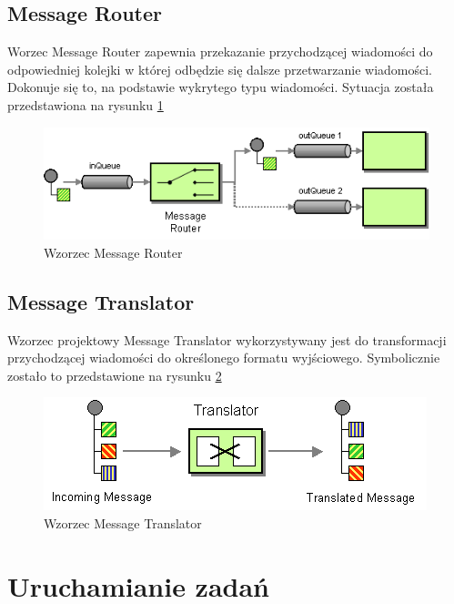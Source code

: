 \subsection{Message Router}
Worzec Message Router zapewnia przekazanie przychodzącej wiadomości do odpowiedniej kolejki w której odbędzie się dalsze przetwarzanie wiadomości.
Dokonuje się to, na podstawie wykrytego typu wiadomości.
Sytuacja została przedstawiona na rysunku \ref{fig:messageRouter}

\begin{figure}[!h]
 \centering
 \includegraphics[width=1.0\textwidth]{eip/MessageRouter}
 \caption{Wzorzec Message Router}
 \label{fig:messageRouter}
\end{figure}

\subsection{Message Translator}
Wzorzec projektowy Message Translator wykorzystywany jest do transformacji przychodzącej wiadomości do określonego formatu wyjściowego.
Symbolicznie zostało to przedstawione na rysunku \ref{fig:messageTranslator}

\begin{figure}[!h]
 \centering
 \includegraphics{eip/MessageTranslator}
 \caption{Wzorzec Message Translator}
 \label{fig:messageTranslator}
\end{figure}

\section{Uruchamianie zadań}
